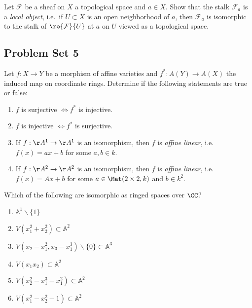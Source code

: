 \begin{exercise}[Gathmann 3.24]

Let \(\mathcal{F}\) be a sheaf on \(X\) a topological space and
\(a\in X\). Show that the stalk \(\mathcal{F}_a\) is a \emph{local
object}, i.e.~if \(U\subset X\) is an open neighborhood of \(a\), then
\(\mathcal{F}_a\) is isomorphic to the stalk of
\(\ro{ \mathcal{F} }{U}\) at \(a\) on \(U\) viewed as a topological
space.

\end{exercise}

\hypertarget{problem-set-5}{%
\subsection{Problem Set 5}\label{problem-set-5}}

\begin{exercise}[Gathmann 4.13]

Let \(f:X\to Y\) be a morphism of affine varieties and
\(f^*: A(Y) \to A(X)\) the induced map on coordinate rings. Determine if
the following statements are true or false:

\begin{enumerate}
\def\labelenumi{\alph{enumi}.}
\item
  \(f\) is surjective \(\iff f^*\) is injective.
\item
  \(f\) is injective \(\iff f^*\) is surjective.
\item
  If \(f:\AA^1\to\AA^1\) is an isomorphism, then \(f\) is \emph{affine
  linear}, i.e.~\(f(x) = ax+b\) for some \(a, b\in k\).
\item
  If \(f:\AA^2\to\AA^2\) is an isomorphism, then \(f\) is \emph{affine
  linear}, i.e.~\(f(x) = Ax+b\) for some \(a \in \Mat(2\times 2, k)\)
  and \(b\in k^2\).
\end{enumerate}

\end{exercise}

\begin{exercise}[Gathmann 4.19]

Which of the following are isomorphic as ringed spaces over \(\CC\)?

\begin{enumerate}
\def\labelenumi{(\alph{enumi})}
\item
  \(\mathbb{A}^{1} \backslash\{1\}\)
\item
  \(V\left(x_{1}^{2}+x_{2}^{2}\right) \subset \mathbb{A}^{2}\)
\item
  \(V\left(x_{2}-x_{1}^{2}, x_{3}-x_{1}^{3}\right) \backslash\{0\} \subset \mathbb{A}^{3}\)
\item
  \(V\left(x_{1} x_{2}\right) \subset \mathbb{A}^{2}\)
\item
  \(V\left(x_{2}^{2}-x_{1}^{3}-x_{1}^{2}\right) \subset \mathbb{A}^{2}\)
\item
  \(V\left(x_{1}^{2}-x_{2}^{2}-1\right) \subset \mathbb{A}^{2}\)
\end{enumerate}

\end{exercise}

